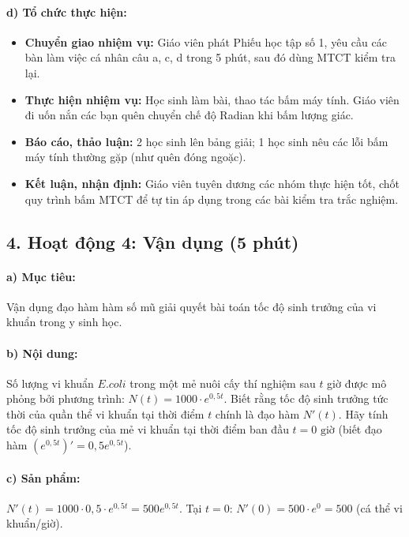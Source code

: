 \documentclass[12pt, a4paper]{article}
\begin{document}
\paragraph{d) Tổ chức thực hiện:}
\begin{itemize}[leftmargin=0.8cm]
    \item \textbf{Chuyển giao nhiệm vụ:} Giáo viên phát Phiếu học tập số 1, yêu cầu các bàn làm việc cá nhân câu a, c, d trong 5 phút, sau đó dùng MTCT kiểm tra lại.
    \item \textbf{Thực hiện nhiệm vụ:} Học sinh làm bài, thao tác bấm máy tính. Giáo viên đi uốn nắn các bạn quên chuyển chế độ Radian khi bấm lượng giác.
    \item \textbf{Báo cáo, thảo luận:} 2 học sinh lên bảng giải; 1 học sinh nêu các lỗi bấm máy tính thường gặp (như quên đóng ngoặc).
    \item \textbf{Kết luận, nhận định:} Giáo viên tuyên dương các nhóm thực hiện tốt, chốt quy trình bấm MTCT để tự tin áp dụng trong các bài kiểm tra trắc nghiệm.
\end{itemize}

\subsection*{4. Hoạt động 4: Vận dụng (5 phút)}

\paragraph{a) Mục tiêu:} Vận dụng đạo hàm hàm số mũ giải quyết bài toán tốc độ sinh trưởng của vi khuẩn trong y sinh học.

\paragraph{b) Nội dung:} Số lượng vi khuẩn $E. coli$ trong một mẻ nuôi cấy thí nghiệm sau $t$ giờ được mô phỏng bởi phương trình: $N(t) = 1000 \cdot e^{0{,}5 t}$. Biết rằng tốc độ sinh trưởng tức thời của quần thể vi khuẩn tại thời điểm $t$ chính là đạo hàm $N'(t)$. Hãy tính tốc độ sinh trưởng của mẻ vi khuẩn tại thời điểm ban đầu $t = 0\text{ giờ}$ (biết đạo hàm $(e^{0{,}5t})' = 0{,}5 e^{0{,}5t}$).

\paragraph{c) Sản phẩm:} $N'(t) = 1000 \cdot 0{,}5 \cdot e^{0{,}5 t} = 500 e^{0{,}5 t}$. Tại $t = 0$: $N'(0) = 500 \cdot e^0 = 500$ (cá thể vi khuẩn/giờ).
\end{document}
